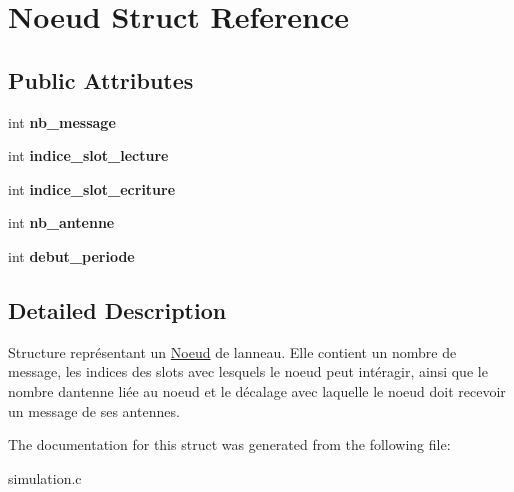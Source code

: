 \hypertarget{structNoeud}{}\section{Noeud Struct Reference}
\label{structNoeud}
\subsection*{Public Attributes}
\begin{DoxyCompactItemize}
\item 
int {\bfseries nb\+\_\+message}\hypertarget{structNoeud_ada9d4501e40dc1a02b3e670f5571c3fe}{}\label{structNoeud_ada9d4501e40dc1a02b3e670f5571c3fe}

\item 
int {\bfseries indice\+\_\+slot\+\_\+lecture}\hypertarget{structNoeud_a961557c38f6d7dda340bd2d578e24d39}{}\label{structNoeud_a961557c38f6d7dda340bd2d578e24d39}

\item 
int {\bfseries indice\+\_\+slot\+\_\+ecriture}\hypertarget{structNoeud_a2fe175b494abe79f37450fed36640fd4}{}\label{structNoeud_a2fe175b494abe79f37450fed36640fd4}

\item 
int {\bfseries nb\+\_\+antenne}\hypertarget{structNoeud_ae3757667edf62a525471c323a8c65de7}{}\label{structNoeud_ae3757667edf62a525471c323a8c65de7}

\item 
int {\bfseries debut\+\_\+periode}\hypertarget{structNoeud_a7b5aa69f8e61b674c222fcf6218ce7eb}{}\label{structNoeud_a7b5aa69f8e61b674c222fcf6218ce7eb}

\end{DoxyCompactItemize}


\subsection{Detailed Description}
Structure représentant un \hyperlink{structNoeud}{Noeud} de l\textquotesingle{}anneau. Elle contient un nombre de message, les indices des slots avec lesquels le noeud peut intéragir, ainsi que le nombre d\textquotesingle{}antenne liée au noeud et le décalage avec laquelle le noeud doit recevoir un message de ses antennes. 

The documentation for this struct was generated from the following file\+:\begin{DoxyCompactItemize}
\item 
simulation.\+c\end{DoxyCompactItemize}
